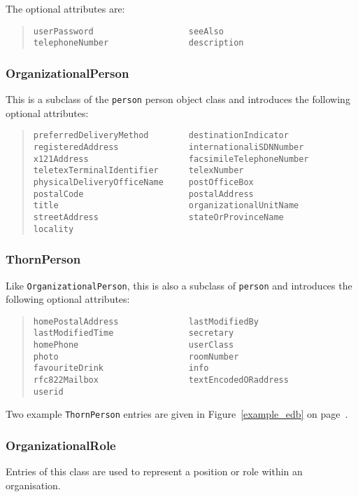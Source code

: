 The optional attributes are:
\begin{quote}\small\begin{verbatim}
userPassword                   seeAlso
telephoneNumber                description
\end{verbatim}\end{quote}

\subsubsection{OrganizationalPerson}
This is a subclass of the \verb+person+ person object class 
and introduces the following optional
attributes:
\begin{quote}\small\begin{verbatim}
preferredDeliveryMethod        destinationIndicator
registeredAddress              internationaliSDNNumber
x121Address                    facsimileTelephoneNumber
teletexTerminalIdentifier      telexNumber
physicalDeliveryOfficeName     postOfficeBox
postalCode                     postalAddress
title                          organizationalUnitName
streetAddress                  stateOrProvinceName
locality
\end{verbatim}\end{quote}

\subsubsection{ThornPerson}
Like \verb+OrganizationalPerson+, this is also a subclass of \verb+person+ 
and introduces the following optional
attributes:
\begin{quote}\small\begin{verbatim}
homePostalAddress              lastModifiedBy
lastModifiedTime               secretary
homePhone                      userClass
photo                          roomNumber
favouriteDrink                 info
rfc822Mailbox                  textEncodedORaddress
userid
\end{verbatim}\end{quote}

Two example \verb+ThornPerson+ entries are given in Figure~\ref{example_edb} on
page~\pageref{example_edb}.

\subsubsection{OrganizationalRole}
Entries of this class are used to represent a position or role within an
organisation.  

